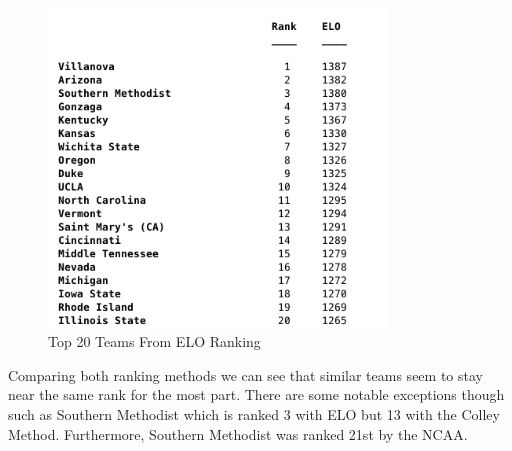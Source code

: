 \documentclass{article}
\begin{document}
\begin{figure}[H]
\centering
\includegraphics[width=0.8\textwidth]{Top20ELO}
\caption{Top 20 Teams From ELO Ranking}
\label{fig:20TeamELO}
\end{figure}
Comparing both ranking methods we can see that similar teams seem to stay near the same rank for the most part. There are some notable exceptions though such as Southern Methodist which is ranked 3 with ELO but 13 with the Colley Method. Furthermore, Southern Methodist was ranked 21st by the NCAA.
\end{document}
